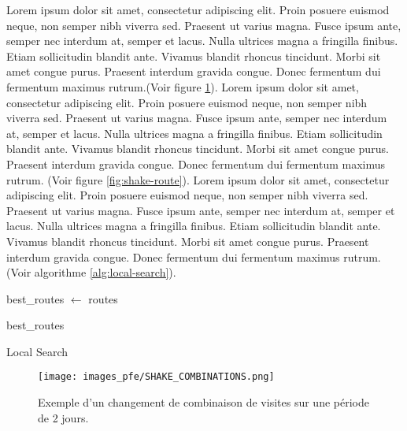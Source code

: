 \medskip

Lorem ipsum dolor sit amet, consectetur adipiscing elit. Proin posuere euismod neque, non semper nibh viverra sed. Praesent ut varius magna. Fusce ipsum ante, semper nec interdum at, semper et lacus. Nulla ultrices magna a fringilla finibus. Etiam sollicitudin blandit ante. Vivamus blandit rhoncus tincidunt. Morbi sit amet congue purus. Praesent interdum gravida congue. Donec fermentum dui fermentum maximus rutrum.(Voir figure \ref{fig:shake-combinations}). Lorem ipsum dolor sit amet, consectetur adipiscing elit. Proin posuere euismod neque, non semper nibh viverra sed. Praesent ut varius magna. Fusce ipsum ante, semper nec interdum at, semper et lacus. Nulla ultrices magna a fringilla finibus. Etiam sollicitudin blandit ante. Vivamus blandit rhoncus tincidunt. Morbi sit amet congue purus. Praesent interdum gravida congue. Donec fermentum dui fermentum maximus rutrum. (Voir figure \ref{fig:shake-route}). Lorem ipsum dolor sit amet, consectetur adipiscing elit. Proin posuere euismod neque, non semper nibh viverra sed. Praesent ut varius magna. Fusce ipsum ante, semper nec interdum at, semper et lacus. Nulla ultrices magna a fringilla finibus. Etiam sollicitudin blandit ante. Vivamus blandit rhoncus tincidunt. Morbi sit amet congue purus. Praesent interdum gravida congue. Donec fermentum dui fermentum maximus rutrum. (Voir algorithme \ref{alg:local-search}).

\medskip

\begin{algorithm}[H]
  best\_routes $\gets$ routes \;

  \Return best\_routes \;
  \caption{Local Search}
  \label{alg:local-search}
\end{algorithm}
\FloatBarrier

\medskip

\begin{figure}[hbt!]
  \centering
  \texttt{[image: images\_pfe/SHAKE\_COMBINATIONS.png]}
  \caption{Exemple d'un changement de combinaison de visites sur une période de 2 jours.}
  \label{fig:shake-combinations}
\end{figure}
\FloatBarrier

